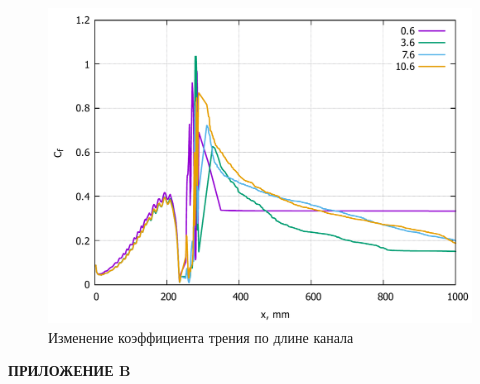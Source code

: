 \appendix
{}
\setcounter{figure}{0}
\begin{figure}[H]
	\centering
	\includegraphics[width=0.9\linewidth]{../Assets/Cf-Tall}
	\caption{Изменение коэффициента трения по длине канала}
	\label{fig:cf-tall}
\end{figure}
\newpage
\begin{flushright}
	\MakeUppercase{\textbf{Приложение B}}
\end{flushright}
